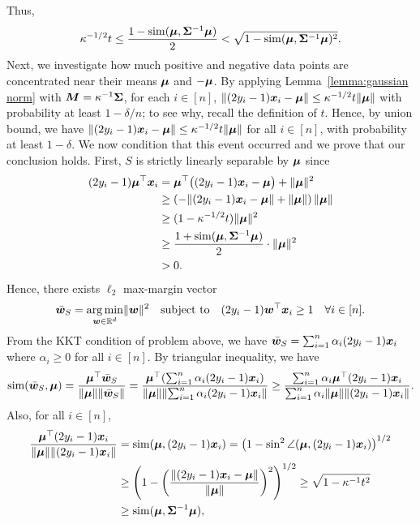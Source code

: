 Thus, 
\begin{equation}
\kappa^{-1/2} t \leq \frac{1-\mathrm{sim}({\bm{\mu}}, {\bm{\Sigma}}^{-1}{\bm{\mu}})}{2} < \sqrt{1-\mathrm{sim}({\bm{\mu}}, {\bm{\Sigma}}^{-1}{\bm{\mu}})^2}.
\label{eqn:ERM_Necessary-3}
\end{equation}
Next, we investigate how much positive and negative data points are concentrated near their means ${\bm{\mu}}$ and $-{\bm{\mu}}$. By applying Lemma~\ref{lemma:gaussian norm} with ${\bm{M}} = \kappa^{-1}{\bm{\Sigma}}$, for each $i\in [n]$, $\lVert (2y_i-1) {\bm{x}}_i -  {\bm{\mu}} \rVert \leq \kappa^{-1/2} t \lVert {\bm{\mu}} \rVert$ with probability at least $1-\delta/n$; to see why, recall the definition of $t$. Hence, by union bound, we have $\lVert (2y_i-1) {\bm{x}}_i -  {\bm{\mu}} \rVert  \leq \kappa^{-1/2}t \lVert {\bm{\mu}} \rVert$ for all $i\in [n]$, with probability at least $1-\delta$. We now condition that this event occurred and we prove that our conclusion holds. First, $S$ is strictly linearly separable by ${\bm{\mu}}$ since 
\begin{align*}
     (2y_i-1) {\bm{\mu}}^\top {\bm{x}}_i &= {\bm{\mu}}^\top \big((2y_i-1){\bm{x}}_i - {\bm{\mu}} \big) + \lVert {\bm{\mu}} \rVert^2\\
     &\geq  \left(- \lVert(2y_i-1){\bm{x}}_i - {\bm{\mu}} \rVert +\lVert {\bm{\mu}} \rVert \right)\lVert {\bm{\mu}} \rVert \\
     &\geq (1-\kappa^{-1/2}t) \lVert {\bm{\mu}}\rVert^2 \\
     &\geq  \frac{1+\mathrm{sim}({\bm{\mu}}, {\bm{\Sigma}}^{-1}{\bm{\mu}})}{2} \cdot \lVert {\bm{\mu}}\rVert^2 \\
     &>0.
\end{align*}
Hence, there exists $\ell_2$ max-margin vector 
\begin{equation*}
    \bar{{\bm{w}}}_S = \operatorname*{arg\,min}_{{\bm{w}}\in \mathbb{R}^d} \lVert {\bm{w}} \rVert^2 \quad \text{subject to} \quad (2y_i-1) {\bm{w}}^\top {\bm{x}}_i \geq 1 \quad \forall i\in [n].
\end{equation*}
From the KKT condition of problem above, we have $\bar{{\bm{w}}}_S = \sum_{i=1}^n \alpha_i (2y_i-1){\bm{x}}_i$ where $\alpha_i \geq 0$ for all $i \in [n]$. By triangular inequality, we have
\begin{equation*}
    \mathrm{sim}(\bar{{\bm{w}}}_S, {\bm{\mu}}) = \frac{{\bm{\mu}}^\top \bar{{\bm{w}}}_S} {\lVert {\bm{\mu}} \rVert \lVert \bar{{\bm{w}}}_S \rVert}
    = \frac{{\bm{\mu}}^\top (\sum_{i=1}^n \alpha_i (2y_i-1){\bm{x}}_i)} {\lVert {\bm{\mu}} \rVert \lVert \sum_{i=1}^n \alpha_i (2y_i-1){\bm{x}}_i \rVert}
    \geq \frac{\sum_{i=1}^n \alpha_i {\bm{\mu}}^\top (2y_i-1){\bm{x}}_i} { \sum_{i=1}^n \alpha_i \lVert {\bm{\mu}}\rVert \lVert (2y_i-1){\bm{x}}_i \rVert}.
\end{equation*}
Also, for all $i \in [n]$,
\begin{align*}
    \frac{{\bm{\mu}}^\top (2y_i-1){\bm{x}}_i}{\lVert {\bm{\mu}}\rVert \lVert (2y_i-1){\bm{x}}_i \rVert} &= \mathrm{sim}({\bm{\mu}}, (2y_i-1){\bm{x}}_i )
    = \left (1-\sin^2 \angle({\bm{\mu}}, (2y_i-1){\bm{x}}_i) \right )^{1/2}\\
    &\geq \left ( 1-\left ( \frac{\lVert (2y_i-1){\bm{x}}_i - {\bm{\mu}} \rVert}{\lVert {\bm{\mu}} \rVert} \right)^2 \right)^{1/2}
    \geq \sqrt{1-\kappa^{-1}t^2}\\
    & \geq \mathrm{sim}({\bm{\mu}}, {\bm{\Sigma}}^{-1}{\bm{\mu}}),
\end{align*}
